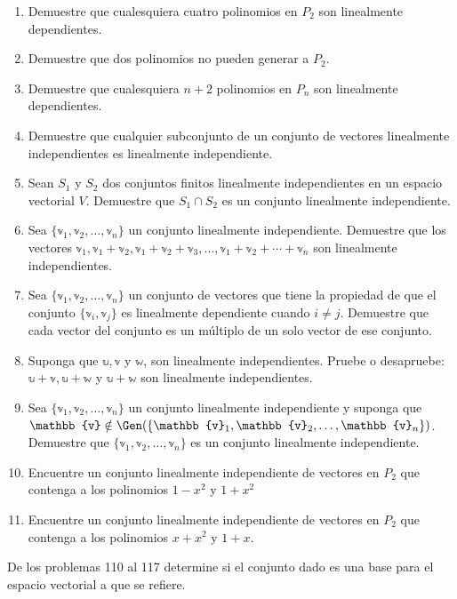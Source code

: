 \begin{enumerate}[start=91]
    \item Demuestre que cualesquiera cuatro polinomios en $P_{2}$ son linealmente dependientes.
    \item Demuestre que dos polinomios no pueden generar a $P_{2}$.
    \item Demuestre que cualesquiera $n+2$ polinomios en $P_{n}$ son linealmente dependientes.
    \item Demuestre que cualquier subconjunto de un conjunto de vectores linealmente independientes es linealmente independiente.
    \item Sean $S_{1}$ y $S_{2}$ dos conjuntos finitos linealmente independientes en un espacio vectorial $V$. Demuestre que $S_{1} \cap S_{2}$ es un conjunto linealmente independiente.
    \item Sea $\{\mathbb{v}_{1}, \mathbb{v}_{2}, \dots, \mathbb{v}_{n}\}$ un conjunto linealmente independiente. Demuestre que los vectores $\mathbb{v}_{1}, \mathbb{v}_{1}+\mathbb{v}_{2}, \mathbb{v}_{1}+\mathbb{v}_{2}+\mathbb{v}_{3}, \dots, \mathbb{v}_{1}+\mathbb{v}_{2}+\cdots+\mathbb{v}_{n}$ son linealmente independientes.
    \item Sea $\{\mathbb{v}_{1}, \mathbb{v}_{2}, \dots, \mathbb{v}_{n}\}$ un conjunto de vectores que tiene la propiedad de que el conjunto $\{\mathbb{v}_{i}, \mathbb{v}_{j}\}$ es linealmente dependiente cuando $i \neq j$. Demuestre que cada vector del conjunto es un múltiplo de un solo vector de ese conjunto.
    \item Suponga que $\mathbb{u}, \mathbb{v}$ y $\mathbb{w}$, son linealmente independientes. Pruebe o desapruebe: $\mathbb{u}+\mathbb{v}, \mathbb{u}+\mathbb{w}$ y $\mathbb{u}+\mathbb{w}$ son linealmente independientes.
    \item Sea $\{\mathbb{v}_{1}, \mathbb{v}_{2}, \dots, \mathbb{v}_{n}\}$ un conjunto linealmente independiente y suponga que $\mathbb{v} \notin \Gen ( \{\mathbb{v}_{1}, \mathbb{v}_{2}, \dots, \mathbb{v}_{n}\} )$. Demuestre que $\{\mathbb{v}_{1}, \mathbb{v}_{2}, \dots, \mathbb{v}_{n}\}$ es un conjunto linealmente independiente.
    \item Encuentre un conjunto linealmente independiente de vectores en $P_{2}$ que contenga a los polinomios $1-x^{2}$ y $1+x^{2}$
    \item Encuentre un conjunto linealmente independiente de vectores en $P_{2}$ que contenga a los polinomios $x+x^{2}$ y $1+x$.
\end{enumerate}
De los problemas 110 al 117 determine si el conjunto dado es una base para el espacio vectorial a que se refiere.
